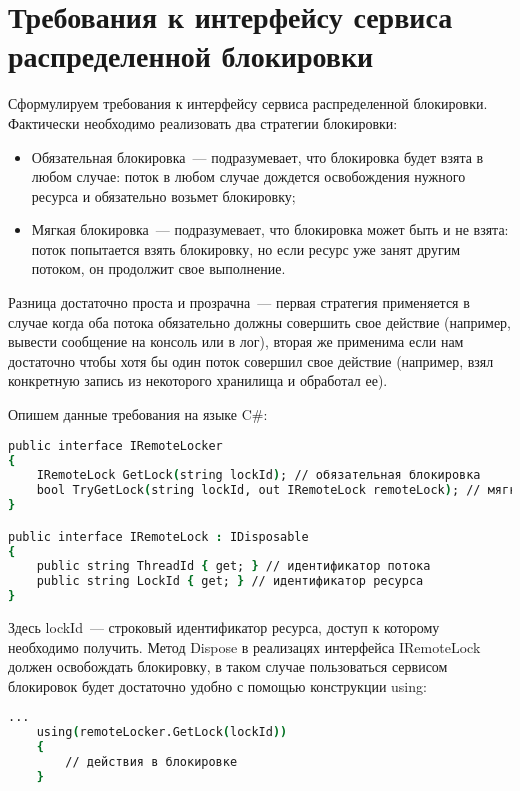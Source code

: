 \section{Требования к интерфейсу сервиса распределенной блокировки}

Сформулируем требования к интерфейсу сервиса распределенной блокировки. Фактически необходимо реализовать два стратегии блокировки:

\begin{itemize} 
	\item Обязательная блокировка~--- подразумевает, что блокировка будет взята в любом случае: поток в любом случае дождется освобождения нужного ресурса и обязательно возьмет блокировку;
	\item Мягкая блокировка~--- подразумевает, что блокировка может быть и не взята: поток попытается взять блокировку, но если ресурс уже занят другим потоком, он продолжит свое выполнение.
\end{itemize}

Разница достаточно проста и прозрачна~--- первая стратегия применяется в случае когда оба потока обязательно должны совершить свое действие (например, вывести сообщение на консоль или в лог), вторая же применима если нам достаточно чтобы хотя бы один поток совершил свое действие (например, взял конкретную запись из некоторого хранилища и обработал ее). 

Опишем данные требования на языке C\#:

\begin{lstlisting}[language=csh,caption={Описание интерфейса}]
public interface IRemoteLocker
{
	IRemoteLock GetLock(string lockId); // обязательная блокировка
	bool TryGetLock(string lockId, out IRemoteLock remoteLock); // мягкая блокировка
}

public interface IRemoteLock : IDisposable
{
	public string ThreadId { get; } // идентификатор потока
	public string LockId { get; } // идентификатор ресурса
}
\end{lstlisting}

Здесь lockId~--- строковый идентификатор ресурса, доступ к которому необходимо получить. Метод Dispose в реализацях интерфейса IRemoteLock должен освобождать блокировку, в таком случае пользоваться сервисом блокировок будет достаточно удобно с помощью конструкции using:

\begin{lstlisting}[language=csh,caption={Использование конструкции using}]
	...
	using(remoteLocker.GetLock(lockId))
	{
		// действия в блокировке
	}
\end{lstlisting}